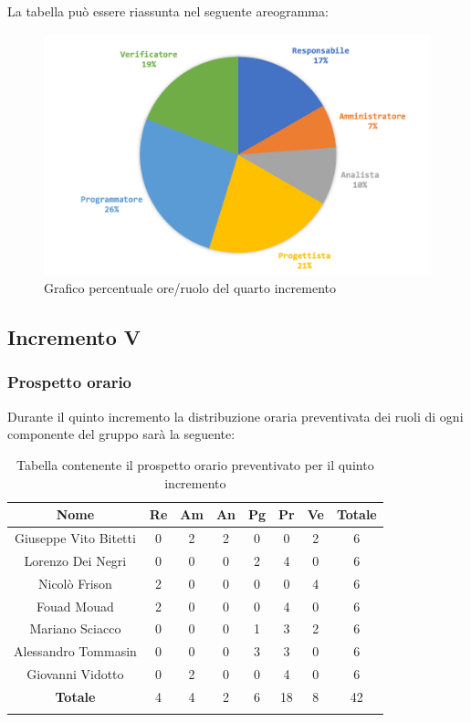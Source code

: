 		La tabella può essere riassunta nel seguente areogramma:
		\begin{figure}[H]
			\centering
			\includegraphics[width=0.8\linewidth]{./images/preventivo/incremento4-2.png}
			\caption{Grafico percentuale ore/ruolo del quarto incremento}
			\label{fig:grafico costi ruolo incremento IV}
		\end{figure}
		
		
		
	\subsection{Incremento V}
		\subsubsection{Prospetto orario}
		Durante il quinto incremento la distribuzione oraria preventivata dei ruoli di ogni componente del gruppo sarà la seguente:
		
		\begin{longtable}{|c|c|c|c|c|c|c|c|}
			\hline
			\rowcolor{lighter-grayer}
			\textbf{Nome} & \textbf{Re} & \textbf{Am} & \textbf{An} & \textbf{Pg}  & \textbf{Pr}   & \textbf{Ve} & \textbf{Totale} \\
			\hline
			\endfirsthead
			
			\hline
			Giuseppe Vito Bitetti 		 & 0 & 2 & 2 & 0 & 0 & 2 & 6\\
			\hline
			\hline
			Lorenzo Dei Negri			 & 0 & 0 & 0 & 2 & 4 & 0 & 6\\
			\hline
			\hline
			Nicolò Frison				    & 2 & 0 & 0 & 0 & 0 & 4 & 6\\
			\hline
			\hline
			Fouad Mouad 				 & 2 & 0 & 0 & 0 & 4 & 0 & 6\\
			\hline
			\hline
			Mariano Sciacco 			 & 0 & 0 & 0 & 1 & 3 & 2 & 6\\
			\hline
			\hline
			Alessandro Tommasin     & 0 & 0 & 0 & 3 & 3 & 0 & 6\\
			\hline
			\hline
			Giovanni Vidotto 			 & 0 & 2 & 0 & 0 & 4 & 0 & 6\\
			\hline 
			\textbf{Totale}			 		& 4 & 4 & 2 & 6 & 18 & 8 & 42\\
			\hline
			\caption{Tabella contenente il prospetto orario preventivato per il quinto incremento}
		\end{longtable}
		\pagebreak
		
